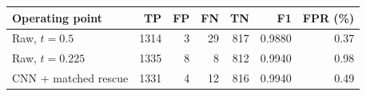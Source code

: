 \begin{tabular}{lrrrrrr}
\toprule
Operating point & TP & FP & FN & TN & F1 & FPR (\%) \\
\midrule
Raw, $t=0.5$ & 1314 & 3 & 29 & 817 & 0.9880 & 0.37 \\
Raw, $t=0.225$ & 1335 & 8 & 8 & 812 & 0.9940 & 0.98 \\
CNN + matched rescue & 1331 & 4 & 12 & 816 & 0.9940 & 0.49 \\
\bottomrule
\end{tabular}
